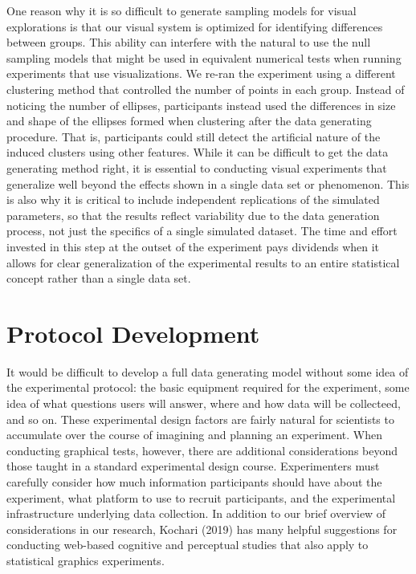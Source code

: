 \documentclass[
  10pt,
]{article}
\begin{document}
One reason why it is so difficult to generate sampling models for visual
explorations is that our visual system is optimized for identifying
differences between groups. This ability can interfere with the natural
to use the null sampling models that might be used in equivalent
numerical tests when running experiments that use visualizations. We
re-ran the experiment using a different clustering method that
controlled the number of points in each group. Instead of noticing the
number of ellipses, participants instead used the differences in size
and shape of the ellipses formed when clustering after the data
generating procedure. That is, participants could still detect the
artificial nature of the induced clusters using other features. While it
can be difficult to get the data generating method right, it is
essential to conducting visual experiments that generalize well beyond
the effects shown in a single data set or phenomenon. This is also why
it is critical to include independent replications of the simulated
parameters, so that the results reflect variability due to the data
generation process, not just the specifics of a single simulated
dataset. The time and effort invested in this step at the outset of the
experiment pays dividends when it allows for clear generalization of the
experimental results to an entire statistical concept rather than a
single data set.

\section{Protocol Development}\label{sec-exp-dev}

It would be difficult to develop a full data generating model without
some idea of the experimental protocol: the basic equipment required for
the experiment, some idea of what questions users will answer, where and
how data will be collecteed, and so on. These experimental design
factors are fairly natural for scientists to accumulate over the course
of imagining and planning an experiment. When conducting graphical
tests, however, there are additional considerations beyond those taught
in a standard experimental design course. Experimenters must carefully
consider how much information participants should have about the
experiment, what platform to use to recruit participants, and the
experimental infrastructure underlying data collection. In addition to
our brief overview of considerations in our research, Kochari (2019) has
many helpful suggestions for conducting web-based cognitive and
perceptual studies that also apply to statistical graphics experiments.
\end{document}
